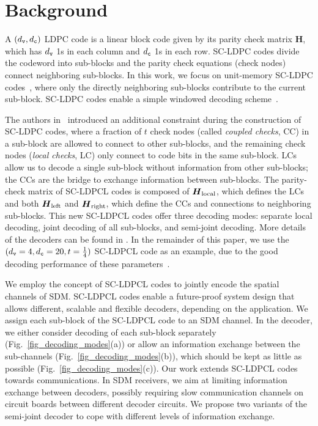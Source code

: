 \section{Background}

A $(d_\mathtt{v}, d_\mathtt{c})$ LDPC code is a linear block code given by its parity check matrix $\boldsymbol{H}$, which has $d_\mathtt{v}$ 1s in each column and $d_\mathtt{c}$ 1s in each row. 
SC-LDPC codes divide the codeword into sub-blocks and the parity check equations (check nodes) 
connect neighboring sub-blocks. In this work, we focus on unit-memory SC-LDPC codes~\cite{schmalen2016design}, where only the directly neighboring sub-blocks contribute to the current sub-block. SC-LDPC codes enable a simple windowed decoding scheme~\cite{schmalen2015spatially}.

The authors in~\cite{9594186,9174265} introduced an additional constraint during the construction of SC-LDPC codes, where a fraction of $t$ check nodes (called \emph{coupled checks}, CC) in a sub-block are allowed to connect to other sub-blocks, and the remaining check nodes (\emph{local checks}, LC)  only connect to code bits in the same sub-block. LCs allow us to decode a single sub-block without information from other sub-blocks; the CCs are the bridge to exchange information between sub-blocks. The parity-check matrix of SC-LDPCL codes is composed of $\boldsymbol{H}_\text{local}$, which defines the LCs and both $\boldsymbol{H}_\text{left}$ and $\boldsymbol{H}_\text{right}$, which define the CCs and connections to neighboring sub-blocks. This new SC-LDPCL codes offer three decoding modes: separate local decoding, joint decoding of all sub-blocks, and semi-joint decoding. More details of the decoders can be found in \cite{9594186,9174265}. In the remainder of this paper, we use the $(d_\mathtt{v}=4, d_\mathtt{c}=20, t=\frac14)$ SC-LDPCL code as an example, due to the good decoding performance of these parameters~\cite{schmalen2015spatially,schmalen2016design}.

We employ the concept of SC-LDPCL codes to jointly encode the spatial channels of SDM. SC-LDPCL codes enable a future-proof system design that allows different, scalable and flexible decoders, depending on the application. We assign each sub-block of the SC-LDPCL code to an SDM channel. In the decoder, we either consider decoding of each sub-block separately  (Fig.~\ref{fig_decoding_modes}(a)) or allow an information exchange between the sub-channels (Fig.~\ref{fig_decoding_modes}(b)), which should be kept as little as possible (Fig.~\ref{fig_decoding_modes}(c)). Our work extends SC-LDPCL codes towards communications. In SDM receivers, we aim at limiting information exchange between decoders, possibly requiring slow communication channels on circuit boards between different decoder circuits. We propose two variants of the semi-joint decoder to cope with different levels of information exchange.